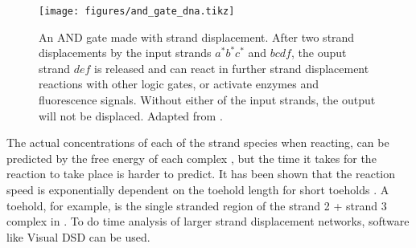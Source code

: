 \begin{figure}[H]
\centering
\texttt{[image: figures/and\_gate\_dna.tikz]}
\caption{An AND gate made with strand displacement. After two strand displacements by the input strands $a^*b^*c^*$ and $bcdf$, the ouput strand $def$ is released and can react in further strand displacement reactions with other logic gates, or activate enzymes and fluorescence signals. Without either of the input strands, the output will not be displaced. Adapted from \cite{Zhang2011}.}
\label{strand_displacement_and}
\end{figure}

The actual concentrations of each of the strand species when reacting, can be predicted by the free energy of each complex \cite{Zhang}, but the time it takes for the reaction to take place is harder to predict. It has been shown that the reaction speed is exponentially dependent on the toehold length for short toeholds \cite{Zhang}. A toehold, for example, is the single stranded region of the strand 2 + strand 3 complex in . To do time analysis of larger strand displacement networks, software like Visual DSD \cite{Lakin2011} can be used.
